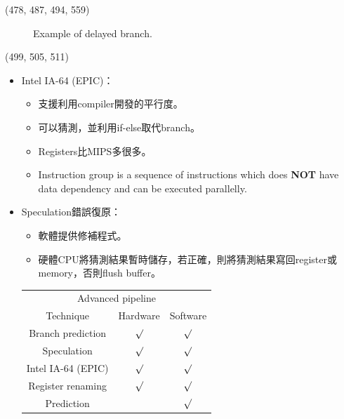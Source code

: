\begin{theorem}{(478, 487, 494, 559)}
\begin{itemize}
\begin{itemize}
\begin{figure}[H]
                \caption{Example of delayed branch.}
                \label{img:delayed-branch}
            \end{figure}
        \end{itemize}
    \end{itemize}
\end{theorem}

\item \begin{theorem}{(499, 505, 511)} \quad\quad \begin{itemize}
        \item Intel IA-64 (EPIC)：\begin{itemize}
            \item 支援利用compiler開發的平行度。
            \item 可以猜測，並利用if-else取代branch。
            \item Registers比MIPS多很多。
            \item Instruction group is a sequence of instructions which does \textbf{NOT} have data dependency and can be executed parallelly.
        \end{itemize}
        \item Speculation錯誤復原：\begin{itemize}
            \item 軟體提供修補程式。
            \item 硬體CPU將猜測結果暫時儲存，若正確，則將猜測結果寫回register或memory，否則flush buffer。
        \end{itemize}
        \begin{table}[H]
            \centering
            \begin{tabular}{|c|c|c|}
                \hline
                \multicolumn{3}{|c|}{Advanced pipeline} \\
                \Xhline{3\arrayrulewidth}
                Technique & Hardware & Software \\
                \Xhline{2\arrayrulewidth}
                Branch prediction & $\surd$ & $\surd$ \\
                \hline
                Speculation & $\surd$ & $\surd$ \\
                \hline
                Intel IA-64 (EPIC) & $\surd$ & $\surd$ \\
                \hline
                Register renaming & $\surd$ & $\surd$ \\
                \hline
                Prediction & & $\surd$ \\
                \hline
            \end{tabular}
        \end{table}
    \end{itemize}
\end{theorem}

